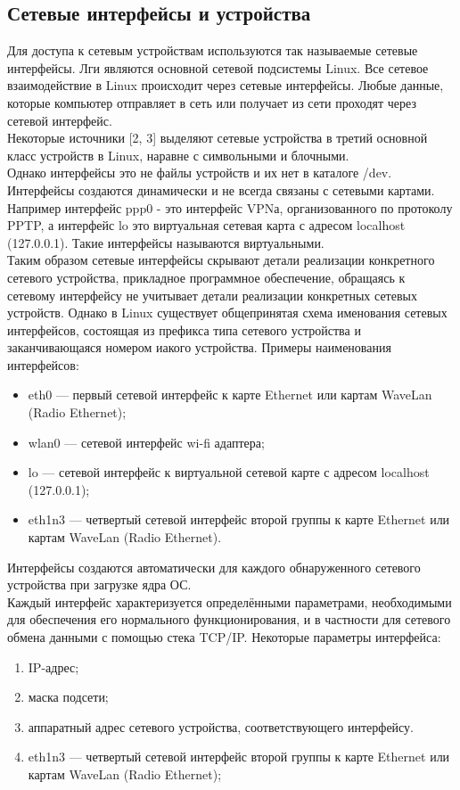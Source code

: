 \documentclass[14pt, a4paper]{extarticle}
\begin{document}
\subsection{Сетевые интерфейсы и устройства}
Для доступа к сетевым устройствам используются так называемые сетевые интерфейсы. Лги являются основной сетевой подсистемы Linux. Все сетевое взаимодействие в Linux происходит через сетевые интерфейсы. Любые данные, которые компьютер отправляет в сеть или получает из сети проходят через сетевой интерфейс. \\
\indent Некоторые источники [2, 3] выделяют сетевые устройства в третий основной класс устройств в Linux, наравне с символьными и блочными. \\
\indent Однако интерфейсы это не файлы устройств и их нет в каталоге /dev. Интерфейсы создаются динамически и не всегда связаны с сетевыми картами. Например интерфейс ppp0 - это интерфейс VPNа, организованного по протоколу PPTP, а интерфейс lo это виртуальная сетевая карта с адресом localhost (127.0.0.1). Такие интерфейсы называются виртуальными. \\
\indent Таким образом сетевые интерфейсы скрывают детали реализации конкретного сетевого устройства, прикладное программное обеспечение, обращаясь к сетевому интерфейсу не учитывает детали реализации конкретных сетевых устройств. Однако в Linux существует общепринятая схема именования сетевых интерфейсов, состоящая из префикса типа сетевого устройства и заканчивающаяся номером иакого устройства. Примеры наименования интерфейсов:
\begin{itemize}
	\item eth0 --- первый сетевой интерфейс к карте Ethernet или картам WaveLan (Radio Ethernet);
	\item wlan0 --- сетевой интерфейс wi-fi адаптера;
	\item  lo --- сетевой интерфейс к виртуальной сетевой карте с адресом localhost (127.0.0.1);
	\item  eth1n3 --- четвертый сетевой  интерфейс второй группы к карте Ethernet или картам WaveLan (Radio Ethernet).
\end{itemize}
Интерфейсы создаются автоматически для каждого обнаруженного сетевого устройства при загрузке ядра ОС. \\
\indent Каждый интерфейс характеризуется определёнными параметрами, необходимыми для обеспечения его нормального функционирования, и в частности для сетевого обмена данными с помощью стека TCP/IP. Некоторые параметры интерфейса:
\begin{enumerate}
	\item IP-адрес;
	\item маска подсети;
	\item аппаратный адрес сетевого устройства, соответствующего интерфейсу.
	\item  eth1n3 --- четвертый сетевой  интерфейс второй группы к карте Ethernet или картам WaveLan (Radio Ethernet);
\end{enumerate}
\end{document}
